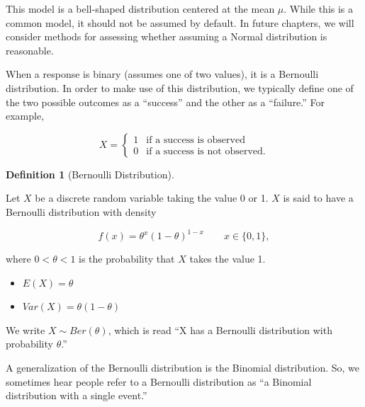 \documentclass[
  letterpaper,
  DIV=11,
  numbers=noendperiod]{scrreprt}
\providecommand{\tightlist}{%
  \setlength{\itemsep}{0pt}\setlength{\parskip}{0pt}}\usepackage{longtable,booktabs,array}
\theoremstyle{definition}
\newtheorem{definition}{Definition}[chapter]
\theoremstyle{definition}
\theoremstyle{remark}
\begin{document}
This model is a bell-shaped distribution centered at the mean \(\mu\).
While this is a common model, it should not be assumed by default. In
future chapters, we will consider methods for assessing whether assuming
a Normal distribution is reasonable.

When a response is binary (assumes one of two values), it is a Bernoulli
distribution. In order to make use of this distribution, we typically
define one of the two possible outcomes as a ``success'' and the other
as a ``failure.'' For example,

\[X = \begin{cases} 1 & \text{if a success is observed} \\ 0 & \text{if a success is not observed.} \end{cases}\]

\begin{definition}[Bernoulli
Distribution]\protect\hypertarget{def-bernoulli-distribution}{}\label{def-bernoulli-distribution}

Let \(X\) be a discrete random variable taking the value 0 or 1. \(X\)
is said to have a Bernoulli distribution with density

\[f(x) = \theta^x (1 - \theta)^{1 - x} \qquad x \in \{0, 1\},\]

where \(0 < \theta < 1\) is the probability that \(X\) takes the value
1.

\begin{itemize}
\tightlist
\item
  \(E(X) = \theta\)
\item
  \(Var(X) = \theta(1 - \theta)\)
\end{itemize}

We write \(X \sim Ber(\theta)\), which is read ``X has a Bernoulli
distribution with probability \(\theta\).''

\end{definition}

\begin{tcolorbox}[enhanced jigsaw, left=2mm, toprule=.15mm, arc=.35mm, breakable, opacitybacktitle=0.6, opacityback=0, rightrule=.15mm, colbacktitle=quarto-callout-note-color!10!white, coltitle=black, leftrule=.75mm, toptitle=1mm, colframe=quarto-callout-note-color-frame, titlerule=0mm, title=\textcolor{quarto-callout-note-color}{\faInfo}\hspace{0.5em}{Note}, bottomrule=.15mm, colback=white, bottomtitle=1mm]

A generalization of the Bernoulli distribution is the Binomial
distribution. So, we sometimes hear people refer to a Bernoulli
distribution as ``a Binomial distribution with a single event.''

\end{tcolorbox}
\end{document}
